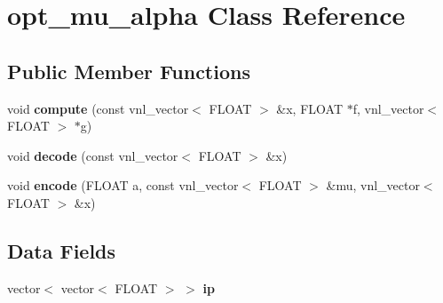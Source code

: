 \hypertarget{classopt__mu__alpha}{
\section{opt\_\-mu\_\-alpha Class Reference}
\label{classopt__mu__alpha}
}
\subsection*{Public Member Functions}
\begin{DoxyCompactItemize}
\item 
\hypertarget{classopt__mu__alpha_aac7ba155f508a57c441b2457632165e4}{
void {\bfseries compute} (const vnl\_\-vector$<$ FLOAT $>$ \&x, FLOAT $\ast$f, vnl\_\-vector$<$ FLOAT $>$ $\ast$g)}
\label{classopt__mu__alpha_aac7ba155f508a57c441b2457632165e4}

\item 
\hypertarget{classopt__mu__alpha_a3ae5aa7812ecc0c688583640b3c56747}{
void {\bfseries decode} (const vnl\_\-vector$<$ FLOAT $>$ \&x)}
\label{classopt__mu__alpha_a3ae5aa7812ecc0c688583640b3c56747}

\item 
\hypertarget{classopt__mu__alpha_aca09165f700102c8e1a5be309cab2a04}{
void {\bfseries encode} (FLOAT a, const vnl\_\-vector$<$ FLOAT $>$ \&mu, vnl\_\-vector$<$ FLOAT $>$ \&x)}
\label{classopt__mu__alpha_aca09165f700102c8e1a5be309cab2a04}

\end{DoxyCompactItemize}
\subsection*{Data Fields}
\begin{DoxyCompactItemize}
\item 
\hypertarget{classopt__mu__alpha_a9d8ca4ddc4fab665da670084c9b37c6d}{
vector$<$ vector$<$ FLOAT $>$ $>$ {\bfseries ip}}
\label{classopt__mu__alpha_a9d8ca4ddc4fab665da670084c9b37c6d}

\end{DoxyCompactItemize}
